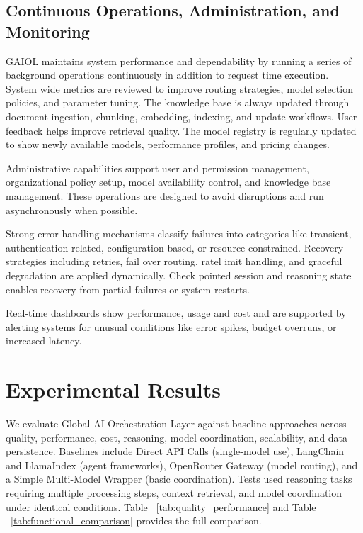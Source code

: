 \documentclass[final,5p,times,twocolumn,authoryear,draft]{elsarticle}
\begin{document}

\subsection{Continuous Operations, Administration, and Monitoring}

GAIOL maintains system performance and dependability by running a series of background operations continuously in addition to request time execution. System wide metrics are reviewed to improve routing strategies, model selection policies, and parameter tuning. The knowledge base is always updated through document ingestion, chunking, embedding, indexing, and update workflows. User feedback helps improve retrieval quality. The model registry is regularly updated to show newly available models, performance profiles, and pricing changes.

Administrative capabilities support user and permission management, organizational policy setup, model availability control, and knowledge base management. These operations are designed to avoid disruptions and run asynchronously when possible.

Strong error handling mechanisms classify failures into categories like transient, authentication-related, configuration-based, or resource-constrained. Recovery strategies including retries, fail over routing, ratel imit handling, and graceful degradation are applied dynamically. Check pointed session and reasoning state enables recovery from partial failures or system restarts.

Real-time dashboards show performance, usage and cost and are supported by alerting systems for unusual conditions like error spikes, budget overruns, or increased latency.

\section{Experimental Results}

We evaluate Global AI Orchestration Layer against baseline approaches across quality, performance, cost, reasoning, model coordination, scalability, and data persistence. Baselines include Direct API Calls (single-model use), LangChain and LlamaIndex (agent frameworks), OpenRouter Gateway (model routing), and a Simple Multi-Model Wrapper (basic coordination). Tests used reasoning tasks requiring multiple processing steps, context retrieval, and model coordination under identical conditions. Table ~\ref{tab:quality_performance} and Table ~\ref{tab:functional_comparison} provides the full comparison.
\end{document}
